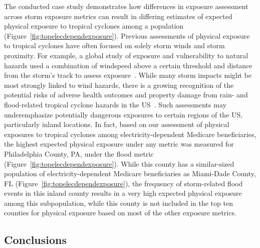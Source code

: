 The conducted case study demonstrates how differences in exposure assessment
across storm exposure metrics can result in differing estimates of expected
physical exposure to tropical cyclones among a population
(Figure~\ref{fig:topelecdependexposure}).  Previous assessments of physical
exposure to tropical cyclones have often focused on solely storm winds and
storm proximity. For example, a global study of exposure and vulnerability to
natural hazards used a combination of windspeed above a certain threshold and
distance from the storm's track to assess
exposure~\parencite{peduzzi2009assessing}. While many storm impacts might be
most strongly linked to wind hazards, there is a growing recognition of the
potential risks of adverse health outcomes and property damage from rain- and
flood-related tropical cyclone hazards in the \ac{US}~\parencite{smith2009}.
Such assessments may underemphasize potentially dangerous exposures to certain
regions of the \ac{US}, particularly inland locations. In fact, based on our
assessment of physical exposures to tropical cyclones among
electricity-dependent Medicare beneficiaries, the highest expected physical
exposure under any metric was measured for Philadelphia County, PA, under the
flood metric (Figure~\ref{fig:topelecdependexposure}).  While this county has a
similar-sized population of electricity-dependent Medicare beneficiaries as
Miami-Dade County, FL (Figure~\ref{fig:topelecdependexposure}), the frequency
of storm-related flood events in this inland county results in a very high
expected physical exposure among this subpopulation, while this county is not
included in the top ten counties for physical exposure based on most of the
other exposure metrics.

\subsection*{Conclusions}

